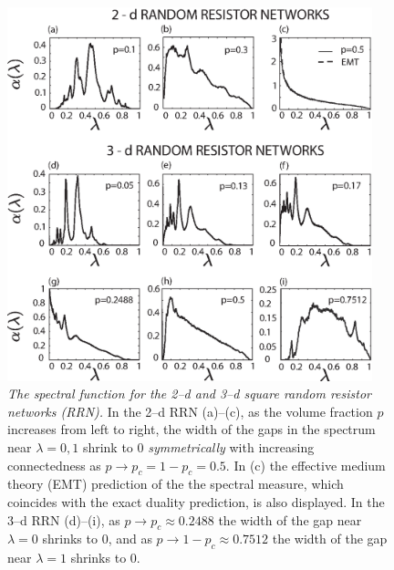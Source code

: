 \documentclass[english,12pt,jmp,graphicx]{revtex4-1}
\begin{document}
%
%
\begin{figure}
\includegraphics[width=25pc]{2-3-d_Random_Resistor_Networks.eps}
\caption{\emph{The spectral function for the 2--d and 3--d square
    random resistor networks (RRN).} In the 2--d RRN (a)--(c), as the
  volume fraction $p$ increases from left to right,
  the width of the gaps in the spectrum near $\lambda=0,1$ shrink to 0
  \emph{symmetrically} with increasing connectedness as
  $p\to p_c=1-p_c=0.5$. In (c) the effective medium theory (EMT)  
  prediction of the the spectral measure, which coincides with the
  exact duality prediction, is also displayed. In
  the 3--d RRN (d)--(i), as $p\to p_c\approx0.2488$ the width of the gap near
  $\lambda=0$ shrinks to 0, and as $p\to1-p_c\approx0.7512$ the width of the gap
  near $\lambda=1$ shrinks to 0.}
\end{figure} \label{fig:2D-RBN}
%
%
\end{document}
